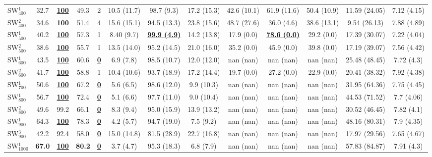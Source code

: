 \documentclass[a4paper,authoryear,review]{elsarticle}
\begin{document}
\begin{table}[]
\begin{adjustbox}{angle=90}
{\begin{tabular}{lcccccccccccc}
                SW$_{400}^{1}$ & 32.7 & {\ul \textbf{100}} & 49.3 & 2 & 10.5 (11.7) & 98.7 (9.3) & 17.2 (15.3) & 42.6 (10.1) & 61.9 (11.6) & 50.4 (10.9) & 11.59 (24.05) & 7.12 (4.15) \\
                SW$_{400}^{2}$ & 34.6 & {\ul \textbf{100}} & 51.4 & 4 & 15.6 (15.1) & 94.5 (13.3) & 23.8 (15.6) & 48.7 (27.6) & 36.0 (4.6) & 38.6 (13.1) & 9.54 (26.13) & 7.88 (4.89) \\
                SW$_{500}^{1}$ & 40.2 & {\ul \textbf{100}} & 57.3 & 1 & 8.40 (9.7) & {\ul \textbf{99.9 (4.9)}} & 14.2 (13.8) & 17.9 (0.0) & {\ul \textbf{78.6 (0.0)}} & 29.2 (0.0) & 17.39 (30.07) & 7.22 (4.04) \\
                SW$_{500}^{2}$ & 38.6 & {\ul \textbf{100}} & 55.7 & 1 & 13.5 (14.0) & 95.2 (14.5) & 21.0 (16.0) & 35.2 (0.0) & 45.9 (0.0) & 39.8 (0.0) & 17.19 (39.07) & 7.56 (4.42) \\
                SW$_{600}^{1}$ & 43.5 & {\ul \textbf{100}} & 60.6 & {\ul \textbf{0}} & 6.9 (7.8) & 98.5 (10.7) & 12.0 (12.0) & nan (nan) & nan (nan) & nan (nan) & 25.48 (48.45) & 7.72 (4.3) \\
                SW$_{600}^{2}$ & 41.7 & {\ul \textbf{100}} & 58.8 & 1 & 10.4 (10.6) & 93.7 (18.9) & 17.2 (14.4) & 19.7 (0.0) & 27.2 (0.0) & 22.9 (0.0) & 20.41 (38.32) & 7.92 (4.38) \\
                SW$_{700}^{1}$ & 50.6 & {\ul \textbf{100}} & 67.2 & {\ul \textbf{0}} & 5.6 (6.5) & 98.6 (12.0) & 9.9 (10.3) & nan (nan) & nan (nan) & nan (nan) & 31.95 (64.36) & 7.75 (4.45) \\
                SW$_{800}^{1}$ & 56.7 & {\ul \textbf{100}} & 72.4 & {\ul \textbf{0}} & 5.1 (6.6) & 97.7 (11.0) & 9.0 (10.4) & nan (nan) & nan (nan) & nan (nan) & 44.53 (71.52) & 7.7 (4.06) \\
                SW$_{800}^{2}$ & 49.6 & 99.2 & 66.1 & {\ul \textbf{0}} & 8.3 (9.4) & 95.0 (15.9) & 13.9 (13.2) & nan (nan) & nan (nan) & nan (nan) & 30.52 (46.45) & 7.82 (4.1) \\
                SW$_{900}^{1}$ & 64.3 & {\ul \textbf{100}} & 78.3 & {\ul \textbf{0}} & 4.2 (5.7) & 94.7 (19.0) & 7.5 (9.2) & nan (nan) & nan (nan) & nan (nan) & 48.16 (80.31) & 7.9 (4.35) \\
                SW$_{900}^{3}$ & 42.2 & 92.4 & 58.0 & {\ul \textbf{0}} & 15.0 (14.8) & 81.5 (28.9) & 22.7 (16.8) & nan (nan) & nan (nan) & nan (nan) & 17.97 (29.56) & 7.65 (4.67) \\
                SW$_{1000}^{1}$ & \textbf{67.0} & {\ul \textbf{100}} & \textbf{80.2} & {\ul \textbf{0}} & 3.7 (4.7) & 95.3 (18.3) & 6.8 (7.9) & nan (nan) & nan (nan) & nan (nan) & 57.83 (84.87) & 7.91 (4.3) \\

\end{tabular}}
\end{adjustbox}
\end{table}
\end{document}
